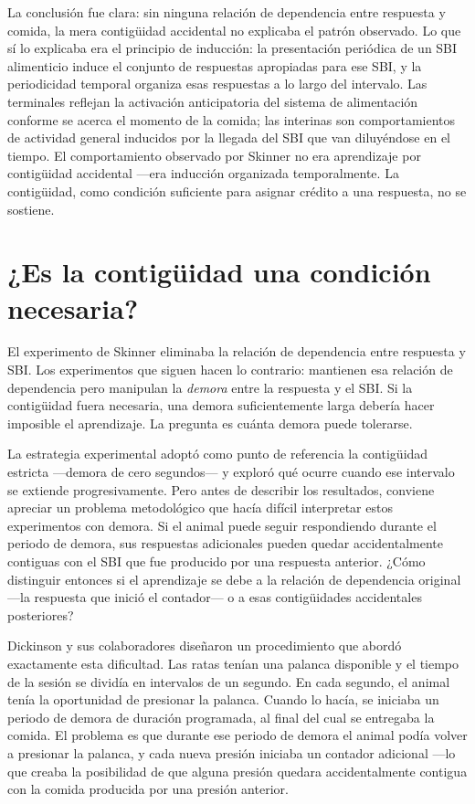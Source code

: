 \documentclass[
  letterpaper,
  DIV=11,
  numbers=noendperiod]{scrreprt}
\begin{document}
\begin{tcolorbox}[enhanced jigsaw, arc=.35mm, bottomrule=.15mm, breakable, colback=white, colframe=quarto-callout-note-color-frame, left=2mm, leftrule=.75mm, opacityback=0, rightrule=.15mm, toprule=.15mm]
La conclusión fue clara: sin ninguna relación de dependencia entre
respuesta y comida, la mera contigüidad accidental no explicaba el
patrón observado. Lo que sí lo explicaba era el principio de inducción:
la presentación periódica de un SBI alimenticio induce el conjunto de
respuestas apropiadas para ese SBI, y la periodicidad temporal organiza
esas respuestas a lo largo del intervalo. Las terminales reflejan la
activación anticipatoria del sistema de alimentación conforme se acerca
el momento de la comida; las interinas son comportamientos de actividad
general inducidos por la llegada del SBI que van diluyéndose en el
tiempo. El comportamiento observado por Skinner no era aprendizaje por
contigüidad accidental ---era inducción organizada temporalmente. La
contigüidad, como condición suficiente para asignar crédito a una
respuesta, no se sostiene.

\section{¿Es la contigüidad una condición
necesaria?}\label{es-la-contiguxfcidad-una-condiciuxf3n-necesaria}

El experimento de Skinner eliminaba la relación de dependencia entre
respuesta y SBI. Los experimentos que siguen hacen lo contrario:
mantienen esa relación de dependencia pero manipulan la \emph{demora}
entre la respuesta y el SBI. Si la contigüidad fuera necesaria, una
demora suficientemente larga debería hacer imposible el aprendizaje. La
pregunta es cuánta demora puede tolerarse.

La estrategia experimental adoptó como punto de referencia la
contigüidad estricta ---demora de cero segundos--- y exploró qué ocurre
cuando ese intervalo se extiende progresivamente. Pero antes de
describir los resultados, conviene apreciar un problema metodológico que
hacía difícil interpretar estos experimentos con demora. Si el animal
puede seguir respondiendo durante el periodo de demora, sus respuestas
adicionales pueden quedar accidentalmente contiguas con el SBI que fue
producido por una respuesta anterior. ¿Cómo distinguir entonces si el
aprendizaje se debe a la relación de dependencia original ---la
respuesta que inició el contador--- o a esas contigüidades accidentales
posteriores?

Dickinson y sus colaboradores diseñaron un procedimiento que abordó
exactamente esta dificultad. Las ratas tenían una palanca disponible y
el tiempo de la sesión se dividía en intervalos de un segundo. En cada
segundo, el animal tenía la oportunidad de presionar la palanca. Cuando
lo hacía, se iniciaba un periodo de demora de duración programada, al
final del cual se entregaba la comida. El problema es que durante ese
periodo de demora el animal podía volver a presionar la palanca, y cada
nueva presión iniciaba un contador adicional ---lo que creaba la
posibilidad de que alguna presión quedara accidentalmente contigua con
la comida producida por una presión anterior.


\end{tcolorbox}
\end{document}
